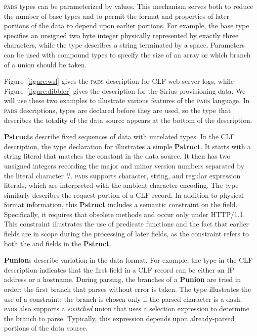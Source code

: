 \documentclass{sigplanconf}
\newcommand{\dibbler}{Sirius}
\newcommand{\figref}[1]{Figure~\ref{#1}}
\newcommand{\bftt}[1]{{\ttfamily\bfseries{#1}}}
\newcommand{\kw}[1]{\bftt{#1}}
\newcommand{\pads}{\textsc{pads}}
\begin{document}
\pads{} types can be parameterized by values.
This mechanism
serves both to reduce the number of base types and to permit the
format and properties of later portions of the data to depend upon earlier portions.
For example, 
the base type  specifies an unsigned two byte integer
physically represented by exactly three characters, while the type
describes a string terminated by a space.  Parameters can be 
used with compound types to specify the size of an array or which
branch of a union should be taken.




\figref{figure:wsl} gives the \pads{} description for CLF web server logs, 
while \figref{figure:dibbler} gives the description for the \dibbler{} 
provisioning data.  We will use these two examples to illustrate various 
features of the \pads{} language.  In \pads{} descriptions, types are declared before they are used, so the type that describes the totality of the data source appears at the bottom of the description.

\kw{Pstruct}s describe fixed sequences of data with unrelated types.
In the CLF description, the type declaration for
 illustrates a simple \kw{Pstruct}. It starts with a 
string literal that matches the constant  in the data source.  It 
then has two unsigned integers recording the major and minor version numbers
separated by the literal character \kw{'.'}.  \pads{} supports character, string,
and regular expression literals, which are interpreted with the ambient character 
encoding. The type  
similarly describes the request portion of a CLF record.  In addition
to physical format information, this \kw{Pstruct} includes a semantic constraint
on the  field.  Specifically, it requires that obsolete methods
 and  occur only under HTTP/1.1.  This constraint illustrates
the use of predicate functions and the fact 
that earlier fields are in scope during the processing of later fields, as the 
constraint
refers to both the  and  fields in the \kw{Pstruct}.

\kw{Punion}s describe variation in the data format.  For example, the
 type in the CLF description indicates that the first field 
in a CLF record can be either an IP address or a hostname.  During parsing, 
the branches of a \kw{Punion} are tried in order; the first branch that 
parses without error is taken.  The  type illustrates the use
of a constraint: the branch  is chosen only if the parsed
character is a dash.  \pads{} also supports a \textit{switched} union that uses a selection expression to determine the branch to parse.  Typically, this expression depends upon already-parsed portions of the data source.
\end{document}

